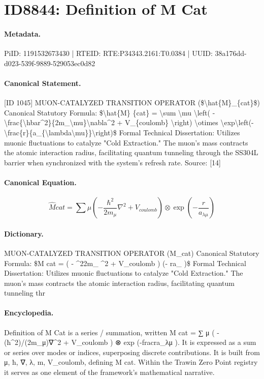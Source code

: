 \section*{ID8844: Definition of M Cat}
\paragraph{Metadata.}
PiID: 1191532673430 | RTEID: RTE:P34343.2161:T0.0384 | UUID: 38a176dd-d023-539f-9889-529053ec0d82

\paragraph{Canonical Statement.}
[ID 1045] MUON-CATALYZED TRANSITION OPERATOR (\$\textbackslash{}hat\{M\}\_\{cat\}\$) Canonical Statutory Formula: \$\textbackslash{}hat\{M\} \{cat\} = \textbackslash{}sum \textbackslash{}mu \textbackslash{}left( -\textbackslash{}frac\{\textbackslash{}hbar\textasciicircum{}2\}\{2m\_\textbackslash{}mu\}\textbackslash{}nabla\textasciicircum{}2 + V\_\{coulomb\} \textbackslash{}right) \textbackslash{}otimes \textbackslash{}exp\textbackslash{}left(-\textbackslash{}frac\{r\}\{a\_\{\textbackslash{}lambda\textbackslash{}mu\}\}\textbackslash{}right)\$ Formal Technical Dissertation: Utilizes muonic fluctuations to catalyze "Cold Extraction." The muon's mass contracts the atomic interaction radius, facilitating quantum tunneling through the SS304L barrier when synchronized with the system's refresh rate. Source: [14]

\paragraph{Canonical Equation.}
\[
\hat{M} {cat} = \sum \mu \left( -\frac{\hbar^2}{2m_\mu}\nabla^2 + V_{coulomb} \right) \otimes \exp\left(-\frac{r}{a_{\lambda\mu}}\right)
\]

\paragraph{Dictionary.}
MUON-CATALYZED TRANSITION OPERATOR (M\_cat) Canonical Statutory Formula: \$M cat = ( - \textasciicircum{}22m\_ \textasciicircum{}2 + V\_coulomb ) (- ra\_ )\$ Formal Technical Dissertation: Utilizes muonic fluctuations to catalyze "Cold Extraction." The muon's mass contracts the atomic interaction radius, facilitating quantum tunneling thr

\paragraph{Encyclopedia.}
Definition of M Cat is a series / summation, written M cat = ∑ μ ( -(ħ\textasciicircum{}2)/(2m\_μ)∇\textasciicircum{}2 + V\_coulomb ) ⊗ exp (-fracra\_λμ ). It is expressed as a sum or series over modes or indices, superposing discrete contributions. It is built from μ, ħ, ∇, λ, m, V\_coulomb, defining M cat. Within the Trawin Zero Point registry it serves as one element of the framework's mathematical narrative.
